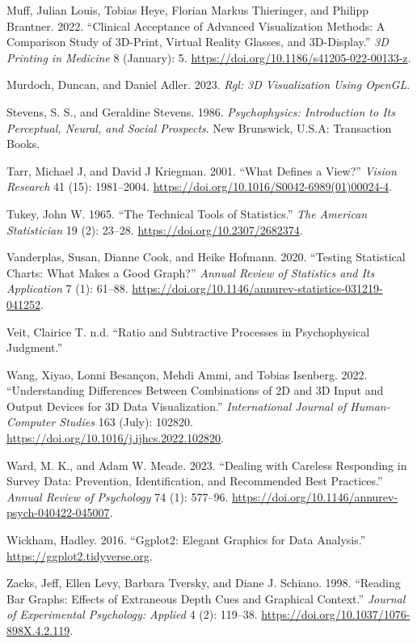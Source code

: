 \documentclass[
  letterpaper,
  DIV=11,
  numbers=noendperiod]{scrartcl}
\newlength{\cslhangindent}
\newenvironment{CSLReferences}[2] %
 {\begin{list}{}{%
  \setlength{\itemindent}{0pt}
  \setlength{\leftmargin}{0pt}
  \setlength{\parsep}{0pt}
  \ifodd #1
   \setlength{\leftmargin}{\cslhangindent}
   \setlength{\itemindent}{-1\cslhangindent}
  \fi
  \setlength{\itemsep}{#2\baselineskip}}}
 {\end{list}}
\begin{document}
\begin{CSLReferences}{1}{0}
Muff, Julian Louis, Tobias Heye, Florian Markus Thieringer, and Philipp
Brantner. 2022. {``Clinical Acceptance of Advanced Visualization
Methods: A Comparison Study of 3D-Print, Virtual Reality Glasses, and
3D-Display.''} \emph{3D Printing in Medicine} 8 (January): 5.
\url{https://doi.org/10.1186/s41205-022-00133-z}.

Murdoch, Duncan, and Daniel Adler. 2023. \emph{Rgl: 3D Visualization
Using OpenGL}.

Stevens, S. S., and Geraldine Stevens. 1986. \emph{Psychophysics:
Introduction to Its Perceptual, Neural, and Social Prospects}. New
Brunswick, U.S.A: Transaction Books.

Tarr, Michael J, and David J Kriegman. 2001. {``What Defines a View?''}
\emph{Vision Research} 41 (15): 1981--2004.
\url{https://doi.org/10.1016/S0042-6989(01)00024-4}.

Tukey, John W. 1965. {``The Technical Tools of Statistics.''} \emph{The
American Statistician} 19 (2): 23--28.
\url{https://doi.org/10.2307/2682374}.

Vanderplas, Susan, Dianne Cook, and Heike Hofmann. 2020. {``Testing
Statistical Charts: What Makes a Good Graph?''} \emph{Annual Review of
Statistics and Its Application} 7 (1): 61--88.
\url{https://doi.org/10.1146/annurev-statistics-031219-041252}.

Veit, Clairice T. n.d. {``Ratio and Subtractive Processes in
Psychophysical Judgment.''}

Wang, Xiyao, Lonni Besançon, Mehdi Ammi, and Tobias Isenberg. 2022.
{``Understanding Differences Between Combinations of 2D and 3D Input and
Output Devices for 3D Data Visualization.''} \emph{International Journal
of Human-Computer Studies} 163 (July): 102820.
\url{https://doi.org/10.1016/j.ijhcs.2022.102820}.

Ward, M. K., and Adam W. Meade. 2023. {``Dealing with {Careless
Responding} in {Survey Data}: {Prevention}, {Identification}, and
{Recommended Best Practices}.''} \emph{Annual Review of Psychology} 74
(1): 577--96. \url{https://doi.org/10.1146/annurev-psych-040422-045007}.

Wickham, Hadley. 2016. {``Ggplot2: Elegant Graphics for Data
Analysis.''} \url{https://ggplot2.tidyverse.org}.

Zacks, Jeff, Ellen Levy, Barbara Tversky, and Diane J. Schiano. 1998.
{``Reading Bar Graphs: Effects of Extraneous Depth Cues and Graphical
Context.''} \emph{Journal of Experimental Psychology: Applied} 4 (2):
119--38. \url{https://doi.org/10.1037/1076-898X.4.2.119}.

\end{CSLReferences}
\end{document}
